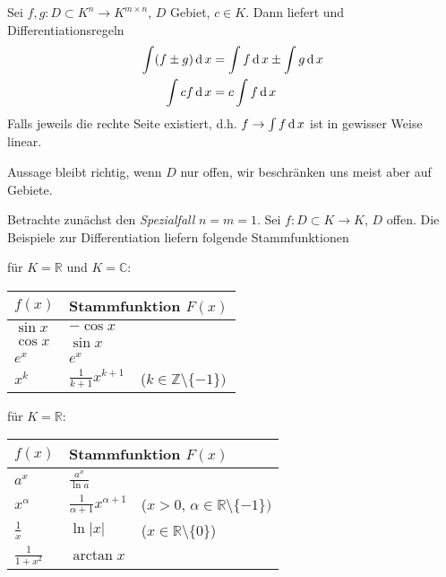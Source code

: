 Sei $f,g:D\subset K^n\to K^{m\times n}$, $D$ Gebiet, $c\in K$. Dann liefert  und Differentiationsregeln
\begin{equation}\label{xx}
\begin{split}
\int (f\pm g) \operatorname{d} x &= \int f \operatorname{d} x \pm \int g \operatorname{d} x \\
\int c f \operatorname{d} x &= c \int f \operatorname{d} x
\end{split}
\end{equation}
Falls jeweils die rechte Seite existiert, d.h. $f\to \int f\operatorname{d} x$ ist in gewisser Weise linear.

\begin{underlinedenvironment}
	Aussage bleibt richtig, wenn $D$ nur offen, wir beschränken uns meist aber auf Gebiete.
\end{underlinedenvironment}

Betrachte zunächst den \emph{Spezialfall} $n=m=1$. Sei $f:D\subset K\to K$, $D$ offen. Die Beispiele zur Differentiation liefern folgende Stammfunktionen

\begin{minipage}{0.45\linewidth}
	\begin{flushleft}
		für $K=\mathbb{R}$ und $K = \mathbb{C}$:
	\end{flushleft}
	\vspace*{1mm}
	\renewcommand{\arraystretch}{1.2}
	\begin{tabularx}{\linewidth}{llX}
		\toprule
		$f(x)$ & \multicolumn{2}{l}{Stammfunktion $F(x)$} \\
		\midrule
		$\sin x$ & $-\cos x$ & \\
		$\cos x$ & $\sin x$ & \\
		$e^x$ & $e^x$ & \\
		$x^k$ & $\frac{1}{k+1} x^{k+1}$ & ($k\in\mathbb{Z}\setminus\{-1\})$ \\
		\bottomrule
	\end{tabularx}
\end{minipage}
\hfill%
\begin{minipage}{0.45\linewidth}
	\begin{flushleft}
		für $K=\mathbb{R}$:
	\end{flushleft}
	\vspace*{1mm}
	\renewcommand{\arraystretch}{1.2}
	\begin{tabularx}{\linewidth}{llX}
		\toprule
		$f(x)$ & \multicolumn{2}{l}{Stammfunktion $F(x)$} \\
		\midrule
		$a^x$ & $\frac{a^x}{\ln a}$ & \\
		$x^\alpha$ & $\frac{1}{\alpha + 1} x^{\alpha + 1}$ & ($x > 0$, $\alpha \in \mathbb{R}\setminus \{ - 1\})$ \\
		$\frac{1}{x}$ & $\ln\vert x\vert$ & ($x\in\mathbb{R}\setminus \{0\}$) \\
		$\frac{1}{1+x^2}$ & $\arctan x$ & \\
		\bottomrule
	\end{tabularx}
\end{minipage}

